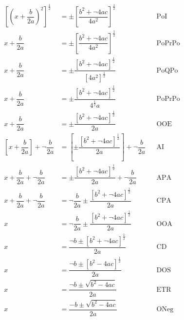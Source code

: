 \begin{align*}
\left[\left( x+ \dfrac{b}{2a} \right)^2\right]^{\frac{1}{2}} &=\pm \left[\dfrac{b^2+ \neg 4ac}{4a^2}\right]^{\frac{1}{2}} && \text{PoI}\\
 x+ \dfrac{b}{2a}  &=\pm \left[\dfrac{b^2+ \neg 4ac}{4a^2}\right]^{\frac{1}{2}} && \text{PoPrPo}\\
x+ \dfrac{b}{2a}  &=\pm \dfrac{\left[b^2+ \neg 4ac \right]^{\frac{1}{2}}}{\left[4a^2\right]^{\frac{1}{2}}} && \text{PoQPo}\\
x+ \dfrac{b}{2a}  &=\pm \dfrac{\left[b^2+ \neg 4ac \right]^{\frac{1}{2}}}{4^{\frac{1}{2}} a} && \text{PoPrPo}\\
x+ \dfrac{b}{2a}  &=\pm \dfrac{\left[b^2+ \neg 4ac \right]^{\frac{1}{2}}}{2a} && \text{OOE}\\
\left[x+ \dfrac{b}{2a}\right] +  \neg   \dfrac{b}{2a} &= \left[\pm\dfrac{\left[b^2+ \neg 4ac \right]^{\frac{1}{2}}}{2a}\right] + \neg \dfrac{b}{2a} && \text{AI}\\
x+ \dfrac{b}{2a} +  \neg   \dfrac{b}{2a} &= \pm\dfrac{\left[b^2+ \neg 4ac \right]^{\frac{1}{2}}}{2a} + \neg \dfrac{b}{2a} && \text{APA}\\
x+ \dfrac{b}{2a} + \neg   \dfrac{b}{2a} &=\neg   \dfrac{b}{2a} \pm\dfrac{\left[b^2+ \neg 4ac \right]^{\frac{1}{2}}}{2a} && \text{CPA}\\
x &=\neg   \dfrac{b}{2a}  \pm\dfrac{\left[b^2+ \neg 4ac \right]^{\frac{1}{2}}}{2a} && \text{OOA}\\
x &= \dfrac{\neg  b  \pm {\left[b^2+ \neg 4ac \right]^{\frac{1}{2}}}}{2a} && \text{CD}\\
x &= \dfrac{\neg  b  \pm {\left[b^2 - 4ac \right]^{\frac{1}{2}}}}{2a} && \text{DOS}\\
x &= \dfrac{\neg  b  \pm {\sqrt{b^2 - 4ac}}}{2a} && \text{ETR}\\
x &= \dfrac{-  b  \pm {\sqrt{b^2 - 4ac}}}{2a} && \text{ONeg}
\end{align*}
